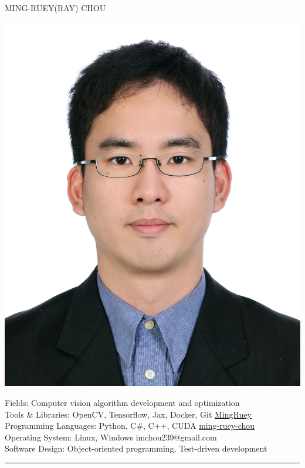 \documentclass[10pt,A4]{article}
\newcommand{\metasection}[2]
{
\footnotesize{#2} \hspace*{\fill} \footnotesize{#1}\\[1pt]
}
\newcommand{\myref}[2] {\textcolor{gray}{\href{#2}{#1}}}
\begin{document}
\pagestyle{fancy}	

\vspace{-8pt}

\begin{minipage}{0.8\textwidth}\flushleft
    \HUGE \textsc{MING-RUEY(RAY) CHOU}\\[2pt]
\end{minipage}
\begin{minipage}{0.2\textwidth}\flushright
    \includegraphics[scale=0.04,trim={0 8cm 0 0},clip]
    {./photo.jpg}
\end{minipage}

\vspace{6pt}

\metasection{}{Fields: Computer vision algorithm development and optimization}
\metasection{ \myref{MingRuey}{https://github.com/MingRuey}}{Tools \& Libraries: OpenCV, Tensorflow, Jax, Docker, Git}
\metasection{ \myref{ming-ruey-chou}{https://www.linkedin.com/in/ming-ruey-chou}}{Programming Languages: Python, C\#, C{++}, CUDA}
\metasection{ imchou239@gmail.com}{Operating System: Linux, Windows}
\metasection{}{Software Design: Object-oriented programming, Test-driven development}
\vspace{-2pt}
\textcolor{softcol}{\hrule}
\vspace{6pt}
\end{document}
